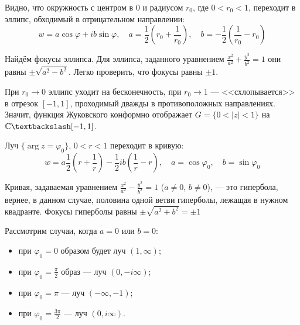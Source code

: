 \documentclass[11pt,openany,a4paper]{scrartcl}
\theoremstyle{plain}
\theoremstyle{definition}
\newcommand\mb{\mathbb}
\newcommand{\complex}{\mb C}
\begin{document}
Видно, что окружность с центром в $0$ и радиусом $r_0$, где $0 < r_0 < 1$, переходит в эллипс, обходимый в
отрицательном направлении:
$$
w = a\cos \varphi + ib\sin \varphi, \quad a = \frac{1}{2}(r_0 + \frac{1}{r_0}), \quad b = -\frac{1}{2}(\frac{1}{r_0} - r_0)
$$

Найдём фокусы эллипса. Для эллипса, заданного уравнением $\frac{x^2}{a^2} + \frac{y^2}{b^2} = 1$ они равны
$\pm \sqrt{a^2 - b^2}$. Легко проверить, что фокусы равны $\pm 1$.

При $r_0 \to 0$ эллипс уходит на бесконечность, при $r_0 \to 1$ — <<схлопывается>> в отрезок $[-1, 1]$, проходимый дважды в 
противоположных направлениях. Значит, функция Жуковского конформно отображает $G = \{0 < |z| < 1\}$ на
$\complex \textbackslash [-1, 1]$.

Луч $\{\arg z = \varphi_0\}$, $0 < r < 1$ переходит в кривую:
$$
w = a\frac{1}{2}(r + \frac{1}{r}) -\frac{1}{2}ib(\frac{1}{r} - r), \quad a = \cos \varphi_0, \quad b = \sin \varphi_0
$$

Кривая, задаваемая уравнением $\frac{x^2}{a^2} - \frac{y^2}{b^2} = 1$ ($a \neq 0$, $b \neq 0$), — это гипербола, вернее,
в данном случае, половина
одной ветви гиперболы, лежащая в нужном квадранте. Фокусы гиперболы равны $\pm \sqrt{a^2 + b^2} = \pm 1$

Рассмотрим случаи, когда $a = 0$ или $b = 0$:
\begin{itemize}
	\item при $\varphi_0 = 0$ образом будет луч $(1, \infty)$;
	\item при $\varphi_0 = \frac{\pi}{2}$ образ — луч $(0, -i\infty)$;
	\item при $\varphi_0 = \pi$ — луч $(-\infty, -1)$;
	\item при $\varphi_0 = \frac{3\pi}{2}$ — луч $(0, i\infty)$.
\end{itemize}
\end{document}

